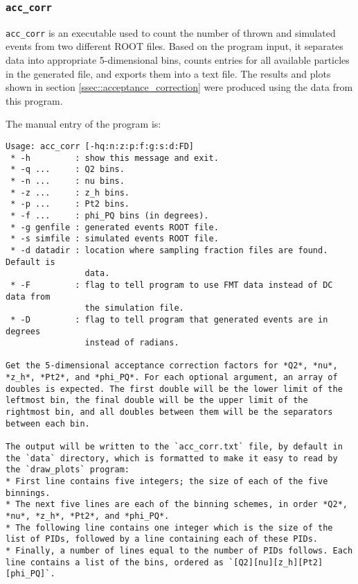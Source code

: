 \subsubsection{\texttt{acc\_corr}}
\label{sssec::acc_corr}
    \texttt{acc\_corr} is an executable used to count the number of thrown and simulated events from two different ROOT files.
    Based on the program input, it separates data into appropriate 5-dimensional bins, counts entries for all available particles in the generated file, and exports them into a text file.
    The results and plots shown in section \ref{ssec::acceptance_correction} were produced using the data from this program.

    The manual entry of the program is:
    \begin{lstlisting}
Usage: acc_corr [-hq:n:z:p:f:g:s:d:FD]
 * -h         : show this message and exit.
 * -q ...     : Q2 bins.
 * -n ...     : nu bins.
 * -z ...     : z_h bins.
 * -p ...     : Pt2 bins.
 * -f ...     : phi_PQ bins (in degrees).
 * -g genfile : generated events ROOT file.
 * -s simfile : simulated events ROOT file.
 * -d datadir : location where sampling fraction files are found. Default is
                data.
 * -F         : flag to tell program to use FMT data instead of DC data from
                the simulation file.
 * -D         : flag to tell program that generated events are in degrees
                instead of radians.

Get the 5-dimensional acceptance correction factors for *Q2*, *nu*, *z_h*, *Pt2*, and *phi_PQ*. For each optional argument, an array of doubles is expected. The first double will be the lower limit of the leftmost bin, the final double will be the upper limit of the rightmost bin, and all doubles between them will be the separators between each bin.

The output will be written to the `acc_corr.txt` file, by default in the `data` directory, which is formatted to make it easy to read by the `draw_plots` program:
* First line contains five integers; the size of each of the five binnings.
* The next five lines are each of the binning schemes, in order *Q2*, *nu*, *z_h*, *Pt2*, and *phi_PQ*.
* The following line contains one integer which is the size of the list of PIDs, followed by a line containing each of these PIDs.
* Finally, a number of lines equal to the number of PIDs follows. Each line contains a list of the bins, ordered as `[Q2][nu][z_h][Pt2][phi_PQ]`.
    \end{lstlisting}
